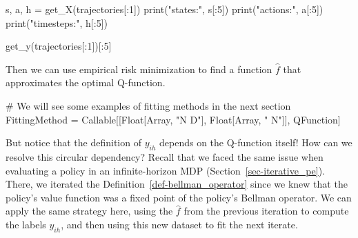\documentclass[
  letterpaper,
  DIV=11,
  numbers=noendperiod]{scrreprt}
\newenvironment{Shaded}{\begin{snugshade}}{\end{snugshade}}
\newcommand{\NormalTok}[1]{\textcolor[rgb]{0.00,0.23,0.31}{#1}}
\theoremstyle{plain}
\theoremstyle{plain}
\theoremstyle{definition}
\theoremstyle{definition}
\theoremstyle{remark}
\begin{document}
\begin{Shaded}
\begin{Highlighting}[]
\NormalTok{s, a, h = get\_X(trajectories[:1])}
\NormalTok{print("states:", s[:5])}
\NormalTok{print("actions:", a[:5])}
\NormalTok{print("timesteps:", h[:5])}
\end{Highlighting}
\end{Shaded}

\begin{Shaded}
\begin{Highlighting}[]
\NormalTok{get\_y(trajectories[:1])[:5]}
\end{Highlighting}
\end{Shaded}

Then we can use empirical risk minimization to find a function
\(\hat f\) that approximates the optimal Q-function.

\begin{Shaded}
\begin{Highlighting}[]
\NormalTok{\# We will see some examples of fitting methods in the next section}
\NormalTok{FittingMethod = Callable[[Float[Array, "N D"], Float[Array, " N"]], QFunction]}
\end{Highlighting}
\end{Shaded}

But notice that the definition of \(y_{i h}\) depends on the Q-function
itself! How can we resolve this circular dependency? Recall that we
faced the same issue when evaluating a policy in an infinite-horizon MDP
(Section~\ref{sec-iterative_pe}). There, we iterated the
Definition~\ref{def-bellman_operator} since we knew that the policy's
value function was a fixed point of the policy's Bellman operator. We
can apply the same strategy here, using the \(\hat f\) from the previous
iteration to compute the labels \(y_{i h}\), and then using this new
dataset to fit the next iterate.
\end{document}
